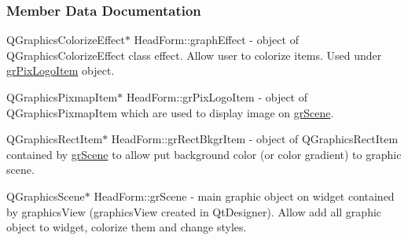 \subsubsection{Member Data Documentation}
\mbox{\label{classHeadForm_a65805e9d52c18a00fd2bece0f560f26a}} 
{\footnotesize\ttfamily Q\+Graphics\+Colorize\+Effect$\ast$ Head\+Form\+::\texorpdfstring{graph\+Effect}{graphEffect}{\ttfamily [private]}} - object of Q\+Graphics\+Colorize\+Effect class effect. Allow user to colorize items. Used under \hyperlink{classHeadForm_a974e25ac4edb0f0a25da108c0b4da4a1}{gr\+Pix\+Logo\+Item} object.

\mbox{\label{classHeadForm_a974e25ac4edb0f0a25da108c0b4da4a1}} 
{\footnotesize\ttfamily Q\+Graphics\+Pixmap\+Item$\ast$ Head\+Form\+::\texorpdfstring{gr\+Pix\+Logo\+Item}{grPixLogoItem}{\ttfamily [private]}} - object of Q\+Graphics\+Pixmap\+Item which are used to display image on \hyperlink{classHeadForm_ac4615e0489c20f6753a1804bfb9d188a}{gr\+Scene}.

\mbox{\label{classHeadForm_acc0cb81dc7cb95b72af6f44ebcc90f4e}} 
{\footnotesize\ttfamily Q\+Graphics\+Rect\+Item$\ast$ Head\+Form\+::\texorpdfstring{gr\+Rect\+Bkgr\+Item}{grRectBkgrItem}{\ttfamily [private]}} - object of Q\+Graphics\+Rect\+Item contained by \hyperlink{classHeadForm_ac4615e0489c20f6753a1804bfb9d188a}{gr\+Scene} to allow put background color (or color gradient) to graphic scene.

\mbox{\label{classHeadForm_ac4615e0489c20f6753a1804bfb9d188a}} 
{\footnotesize\ttfamily Q\+Graphics\+Scene$\ast$ Head\+Form\+::\texorpdfstring{gr\+Scene}{grScene}{\ttfamily [private]}} - main graphic object on widget contained by graphicsView (graphicsView created in Qt\+Designer). Allow add all graphic object to widget, colorize them and change styles.

